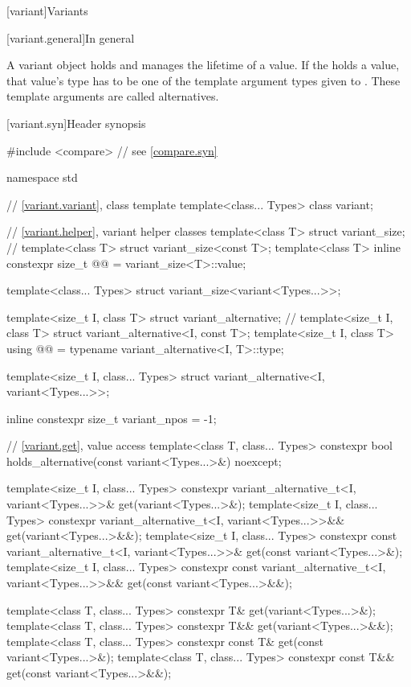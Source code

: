 [variant]{Variants}

[variant.general]{In general}

\pnum
A variant object holds and manages the lifetime of a value.
If the  holds a value, that value's type has to be one
of the template argument types given to .
These template arguments are called alternatives.

[variant.syn]{Header  synopsis}
%

\begin{codeblock}
#include <compare>              // see \ref{compare.syn}

namespace std {
  // \ref{variant.variant}, class template 
  template<class... Types>
    class variant;

  // \ref{variant.helper}, variant helper classes
  template<class T> struct variant_size;                        // \notdef
  template<class T> struct variant_size<const T>;
  template<class T>
    inline constexpr size_t @@ = variant_size<T>::value;

  template<class... Types>
    struct variant_size<variant<Types...>>;

  template<size_t I, class T> struct variant_alternative;       // \notdef
  template<size_t I, class T> struct variant_alternative<I, const T>;
  template<size_t I, class T>
    using @@ = typename variant_alternative<I, T>::type;

  template<size_t I, class... Types>
    struct variant_alternative<I, variant<Types...>>;

  inline constexpr size_t variant_npos = -1;

  // \ref{variant.get}, value access
  template<class T, class... Types>
    constexpr bool holds_alternative(const variant<Types...>&) noexcept;

  template<size_t I, class... Types>
    constexpr variant_alternative_t<I, variant<Types...>>& get(variant<Types...>&);
  template<size_t I, class... Types>
    constexpr variant_alternative_t<I, variant<Types...>>&& get(variant<Types...>&&);
  template<size_t I, class... Types>
    constexpr const variant_alternative_t<I, variant<Types...>>& get(const variant<Types...>&);
  template<size_t I, class... Types>
    constexpr const variant_alternative_t<I, variant<Types...>>&& get(const variant<Types...>&&);

  template<class T, class... Types>
    constexpr T& get(variant<Types...>&);
  template<class T, class... Types>
    constexpr T&& get(variant<Types...>&&);
  template<class T, class... Types>
    constexpr const T& get(const variant<Types...>&);
  template<class T, class... Types>
    constexpr const T&& get(const variant<Types...>&&);

}
\end{codeblock}
